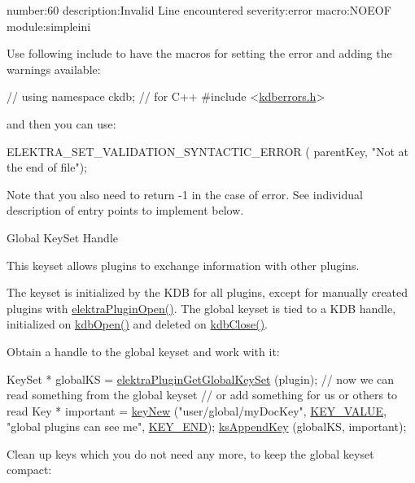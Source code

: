 \begin{DoxyCodeInclude}
number:60
description:Invalid Line encountered
severity:error
macro:NOEOF
module:simpleini
\end{DoxyCodeInclude}
 Use following include to have the macros for setting the error and adding the warnings available\+:


\begin{DoxyCodeInclude}
\textcolor{comment}{// using namespace ckdb; // for C++}
\textcolor{preprocessor}{#include <\hyperlink{kdberrors_8h}{kdberrors.h}>}
\end{DoxyCodeInclude}
 and then you can use\+:


\begin{DoxyCodeInclude}
ELEKTRA\_SET\_VALIDATION\_SYNTACTIC\_ERROR ( parentKey, \textcolor{stringliteral}{"Not at the end of file"});
\end{DoxyCodeInclude}
 Note that you also need to return -\/1 in the case of error. See individual description of entry points to implement below.

\begin{DoxyParagraph}{Global Key\+Set Handle}

\end{DoxyParagraph}
This keyset allows plugins to exchange information with other plugins.

The keyset is initialized by the K\+DB for all plugins, except for manually created plugins with {\ttfamily \hyperlink{elektra_2plugin_8c_a32a70a7876542c51d153164ac5108a57}{elektra\+Plugin\+Open()}}. The global keyset is tied to a K\+DB handle, initialized on {\ttfamily \hyperlink{group__kdb_ga6808defe5870f328dd17910aacbdc6ca}{kdb\+Open()}} and deleted on {\ttfamily \hyperlink{group__kdb_gadb54dc9fda17ee07deb9444df745c96f}{kdb\+Close()}}.

Obtain a handle to the global keyset and work with it\+:


\begin{DoxyCodeInclude}
        KeySet * globalKS = \hyperlink{group__plugin_ga436cda13ed70c0face08661a90620bf6}{elektraPluginGetGlobalKeySet} (plugin);
        \textcolor{comment}{// now we can read something from the global keyset}
        \textcolor{comment}{// or add something for us or others to read}
        Key * important = \hyperlink{group__key_gad23c65b44bf48d773759e1f9a4d43b89}{keyNew} (\textcolor{stringliteral}{"user/global/myDocKey"}, \hyperlink{group__key_gga9b703ca49f48b482def322b77d3e6bc8ac66e4a49d09212b79f5754ca6db5bd2e}{KEY\_VALUE}, \textcolor{stringliteral}{"global plugins can see
       me"}, \hyperlink{group__key_gga9b703ca49f48b482def322b77d3e6bc8aa8adb6fcb92dec58fb19410eacfdd403}{KEY\_END});
        \hyperlink{group__keyset_gaa5a1d467a4d71041edce68ea7748ce45}{ksAppendKey} (globalKS, important);
\end{DoxyCodeInclude}
 Clean up keys which you do not need any more, to keep the global keyset compact\+:


